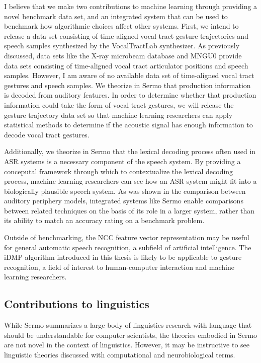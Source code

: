 I believe that we make two contributions
to machine learning through
providing a novel benchmark data set,
and an integrated system that can
be used to benchmark how algorithmic choices
affect other systems.
First, we intend to release a data set
consisting of time-aligned
vocal tract gesture trajectories
and speech samples synthesized
by the VocalTractLab synthesizer.
As previously discussed,
data sets like the
X-ray microbeam database \citep{westbury1990}
and MNGU0 \citep{steiner2012}
provide data sets
consisting of time-aligned
vocal tract articulator positions
and speech samples.
However, I am aware of no available data set
of time-aligned vocal tract gestures
and speech samples.
We theorize in Sermo
that production information
is decoded from auditory features.
In order to determine whether
that production information
could take the form of vocal tract gestures,
we will release the
gesture trajectory data set
so that machine learning researchers
can apply statistical methods
to determine if the acoustic signal
has enough information to decode
vocal tract gestures.

Additionally, we theorize in Sermo
that the lexical decoding process
often used in ASR systems
is a necessary component
of the speech system.
By providing a conceputal framework
through which to contextualize
the lexical decoding process,
machine learning researchers can
see how an ASR system might fit into
a biologically plausible speech system.
As was shown in the comparison
between auditory periphery models,
integrated systems like Sermo
enable comparisons between related techniques
on the basis of its role in a larger system,
rather than its ability to match
an accuracy rating on a benchmark problem.

Outside of benchmarking, the NCC
feature vector representation
may be useful for
general automatic speech recognition,
a subfield of artificial intelligence.
The iDMP algorithm
introduced in this thesis is likely to be
applicable to gesture recognition,
a field of interest to human-computer interaction
and machine learning researchers.

\subsection{Contributions to linguistics}

While Sermo summarizes a large body of
linguistics research with language
that should be understandable for
computer scientists,
the theories embodied in Sermo
are not novel in the context of linguistics.
However, it may be instructive to see
linguistic theories
discussed with computational
and neurobiological terms.

